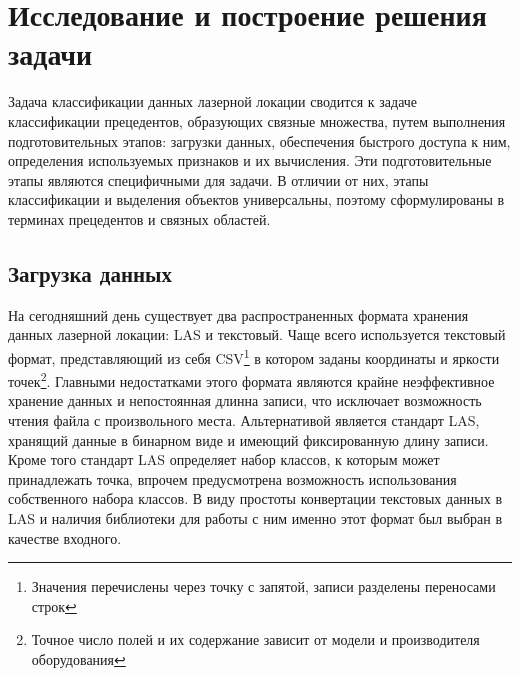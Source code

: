 \newpage
\section{Исследование и построение решения задачи}
\label{research}

Задача классификации данных лазерной локации сводится к задаче классификации прецедентов, образующих связные множества, путем выполнения подготовительных этапов: загрузки данных, обеспечения быстрого доступа к ним, определения используемых признаков и их вычисления. Эти подготовительные этапы являются специфичными для задачи. В отличии от них, этапы классификации и выделения объектов универсальны, поэтому сформулированы в терминах прецедентов и связных областей.

\subsection{Загрузка данных}

На сегодняшний день существует два распространенных формата хранения данных лазерной локации: LAS и текстовый. Чаще всего используется текстовый формат, представляющий из себя CSV\footnote{Значения перечислены через точку с запятой, записи разделены переносами строк} в котором заданы координаты и яркости точек\footnote{Точное число полей и их содержание зависит от модели и производителя оборудования}. Главными недостатками этого формата являются крайне неэффективное хранение данных и непостоянная длинна записи, что исключает возможность чтения файла с произвольного места. Альтернативой является стандарт LAS, хранящий данные в бинарном виде и имеющий фиксированную длину записи. Кроме того стандарт LAS определяет набор классов, к которым может принадлежать точка, впрочем предусмотрена возможность использования собственного набора классов. В виду простоты конвертации текстовых данных в LAS и наличия библиотеки для работы с ним именно этот формат был выбран в качестве входного.

